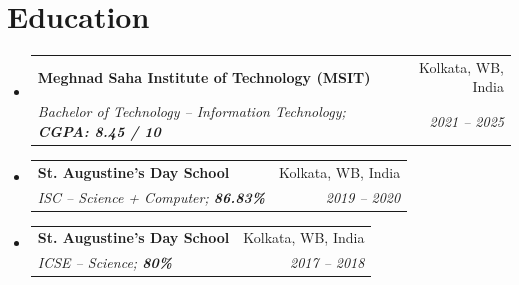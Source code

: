 \documentclass[letterpaper,10.8pt]{article}
\makeatletter
\newcommand{\resumeSubheading}[4]{
  \vspace{-1pt}\item
    \begin{tabular*}{0.97\textwidth}{l@{\extracolsep{\fill}}r}
      \textbf{#1} & #2 \\
      \textit{\small#3} & \textit{\small #4} \\
    \end{tabular*}\vspace{-5pt}
}
\newcommand{\resumeSubHeadingListStart}{\begin{itemize}[leftmargin=*]}
\newcommand{\resumeSubHeadingListEnd}{\end{itemize}}
\makeatother
\begin{document}
\section{Education}
\resumeSubHeadingListStart
\resumeSubheading
{Meghnad Saha Institute of Technology (MSIT)}{Kolkata, WB, India}
{Bachelor of Technology -- Information Technology; \textbf{CGPA: 8.45 / 10}}{2021 -- 2025}
\resumeSubheading
{St. Augustine's Day School}{Kolkata, WB, India}
{ISC -- Science + Computer; \textbf{86.83\%}}{2019 -- 2020}
\resumeSubheading
{St. Augustine's Day School}{Kolkata, WB, India}
{ICSE -- Science; \textbf{80\%}}{2017 -- 2018}
\resumeSubHeadingListEnd
\end{document}
